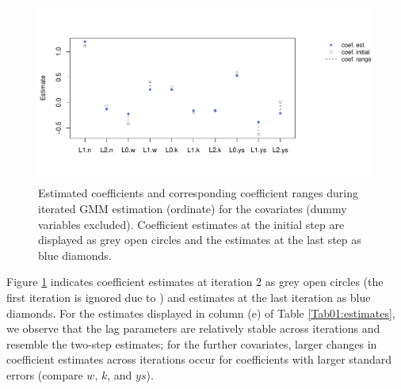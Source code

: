 \begin{figure}[ht]
  \centering
  \includegraphics[width = 12cm, height = 6cm]{plot_pdynmc_coef_range.pdf}
  \caption{Estimated coefficients and corresponding coefficient ranges during iterated GMM estimation (ordinate) for the covariates (dummy variables excluded). Coefficient estimates at the initial step are displayed as grey open circles and the estimates at the last step as blue diamonds.}\label{fig:pdynmc_coef_range}
\end{figure}

Figure \ref{fig:pdynmc_coef_range} indicates coefficient estimates at iteration 2 as grey open circles (the first iteration is ignored due to ) and estimates at the last iteration as blue diamonds. For the estimates displayed in column (e) of Table \ref{Tab01:estimates}, we observe that the lag parameters are relatively stable across iterations and resemble the two-step estimates; for the further covariates, larger changes in coefficient estimates across iterations occur for coefficients with larger standard errors (compare $w$, $k$, and $ys$).

